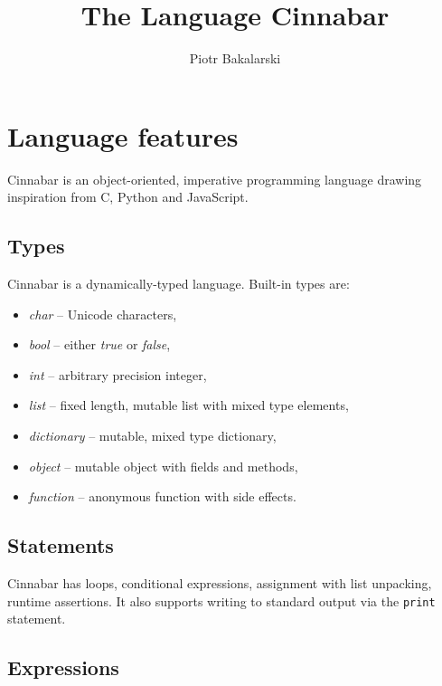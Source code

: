 \documentclass[a4paper,11pt]{article}
\author{Piotr Bakalarski}
\title{The Language Cinnabar}
\begin{document}
\maketitle

\newcommand{\emptyP}{\mbox{$\epsilon$}}
\newcommand{\terminal}[1]{\mbox{{\texttt {#1}}}}
\newcommand{\nonterminal}[1]{\mbox{$\langle \mbox{{\sl #1 }} \! \rangle$}}
\newcommand{\arrow}{\mbox{::=}}
\newcommand{\delimit}{\mbox{$|$}}
\newcommand{\reserved}[1]{\mbox{{\texttt {#1}}}}
\newcommand{\literal}[1]{\mbox{{\texttt {#1}}}}
\newcommand{\symb}[1]{\mbox{{\texttt {#1}}}}

\section*{Language features}

Cinnabar is an object-oriented, imperative programming language drawing inspiration from C, Python and JavaScript. 

\subsection*{Types}

Cinnabar is a dynamically-typed language. Built-in types are:
\begin{itemize}
\item \emph{char} -- Unicode characters,
\item \emph{bool} -- either \emph{true} or \emph{false},
\item \emph{int} -- arbitrary precision integer,
\item \emph{list} -- fixed length, mutable list with mixed type elements,
\item \emph{dictionary} -- mutable, mixed type dictionary,
\item \emph{object} -- mutable object with fields and methods,
\item \emph{function} -- anonymous function with side effects.
\end{itemize} 

\subsection*{Statements}
Cinnabar has loops, conditional expressions, assignment with list unpacking, runtime assertions. It also supports writing to standard output via the {\tt print} statement.

\subsection*{Expressions}
\end{document}
